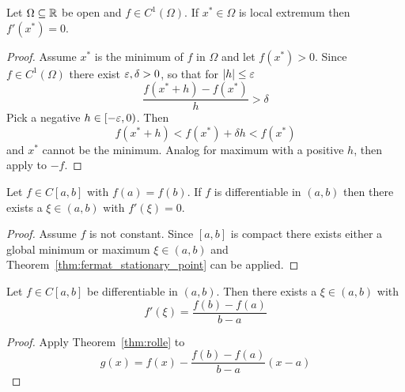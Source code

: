 \begin{theorem}\label{thm:fermat_stationary_point}
    Let \( \Omega \subseteq \mathbb{R} \) be open and \( f \in C^1(\Omega) \). If \( x^* \in \Omega \) is local extremum
    then \( f'(x^*) = 0 \).
\end{theorem}

\begin{proof}
    Assume \( x^* \) is the minimum of \( f \) in \( \Omega \) and let \( f(x^*) > 0 \).
    Since \( f \in C^1(\Omega) \) there exist \( \varepsilon, \delta > 0 \), so that for \( |h| \le \varepsilon \)
    \[
        \frac{f(x^* + h) - f(x^*)}{h} > \delta
    \]
    Pick a negative \( h \in [-\varepsilon, 0) \). Then
    \[
        f(x^* + h) < f(x^*) +  \delta h < f(x^*)
    \]
    and \( x^* \) cannot be the minimum. Analog for maximum with a positive \( h \), then apply to \( -f \).
\end{proof}
\bigskip


\begin{theorem}[Rolle]\label{thm:rolle}
    Let \( f \in C[a,b] \) with \( f(a) = f(b) \). If \( f \) is differentiable in \( (a, b) \) then
    there exists a \( \xi \in (a,b) \) with \( f'(\xi) = 0 \).
\end{theorem}

\begin{proof}
    Assume \( f \) is not constant. Since \( [a,b] \) is compact there exists either a global minimum or maximum
    \( \xi \in (a,b) \) and Theorem~\ref{thm:fermat_stationary_point} can be applied.
\end{proof}
\bigskip


\begin{theorem}\label{thm:mean_value}
    Let \( f \in C[a,b] \) be differentiable in \( (a, b) \). Then there exists a \( \xi \in (a,b) \) with
    \[
        f'(\xi) = \frac{f(b) - f(a)}{b - a}
    \]
\end{theorem}

\begin{proof}
    Apply Theorem~\ref{thm:rolle} to
    \[
        g(x) = f(x) - \frac{f(b) - f(a)}{b - a} (x -a)
    \]
\end{proof}
\bigskip


